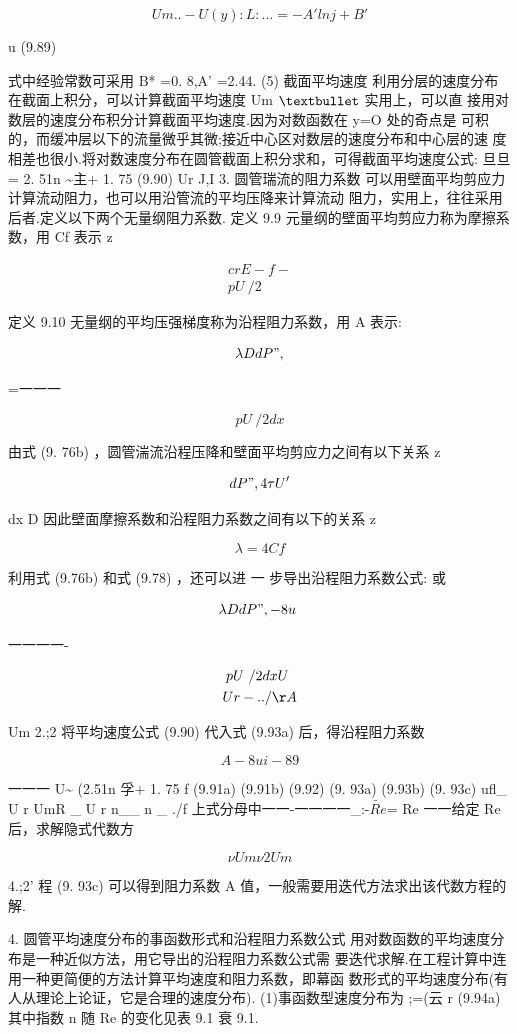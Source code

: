 \[Um.. - U(y) :L:... =-A'lnj+B'\]

u (9.89)

式中经验常数可采用 B* =0. 8,A' =2.44. (5) 截面平均速度 利用分层的速度分布在截面上积分，可以计算截面平均速度 Um ${\rm •}$ 实用上，可以直 接用对数层的速度分布积分计算截面平均速度.因为对数函数在 y=O 处的奇点是 可积的，而缓冲层以下的流量微乎其微;接近中心区对数层的速度分布和中心层的速 度相差也很小.将对数速度分布在圆管截面上积分求和，可得截面平均速度公式: 旦旦= 2. 51n \textasciitilde{}主+ 1. 75 (9.90) Ur J,I 3. 圆管瑞流的阻力系数 可以用壁面平均剪应力计算流动阻力，也可以用沿管流的平均压降来计算流动 阻力，实用上，往往采用后者.定义以下两个无量纲阻力系数. 定义 9.9 元量纲的壁面平均剪应力称为摩擦系数，用 Cf 表示 z

\begin{gather*}
c rE -f -\\
pU~/2
\end{gather*}

定义 9.10 无量纲的平均压强梯度称为沿程阻力系数，用 A 表示:

\[\lambda D dP",\]

=一一一

\[pU~/2 dx\]

由式 (9. 76b) ，圆管湍流沿程压降和壁面平均剪应力之间有以下关系 z

\[dP", 4\tau U'\]

dx D 因此壁面摩擦系数和沿程阻力系数之间有以下的关系 z

\[\lambda  = 4Cf\]

利用式 (9.76b) 和式 (9.78) ，还可以进 一 步导出沿程阻力系数公式: 或

\[\lambda D dP", - 8u~\]

一一一一-

\begin{gather*}
pU~/2 dx U~\\
Ur - ../\AA 
\end{gather*}

Um 2.;2 将平均速度公式 (9.90) 代入式 (9.93a) 后，得沿程阻力系数

\[A-8ui-89\]

一一一 U\textasciitilde{} (2.51n 孚+ 1. 75 f (9.91a) (9.91b) (9.92) (9. 93a) (9.93b) (9. 93c) ufl\_ U r UmR \_ U r n\_\_ n \_ ./f 上式分母中一一-一一一一\_:-$\tilde{Re}$= Re 一一给定 Re 后，求解隐式代数方

\[\nu  Um \nu  2Um\]

4.;2' 程 (9. 93c) 可以得到阻力系数 A 值，一般需要用迭代方法求出该代数方程的解.

4. 圆管平均速度分布的事函数形式和沿程阻力系数公式 用对数函数的平均速度分布是一种近似方法，用它导出的沿程阻力系数公式需 要迭代求解.在工程计算中连用一种更简便的方法计算平均速度和阻力系数，即幕函 数形式的平均速度分布(有人从理论上论证，它是合理的速度分布). (1)事函数型速度分布为 ;=(云 r (9.94a) 其中指数 n 随 Re 的变化见表 9.1 衰 9.1.

